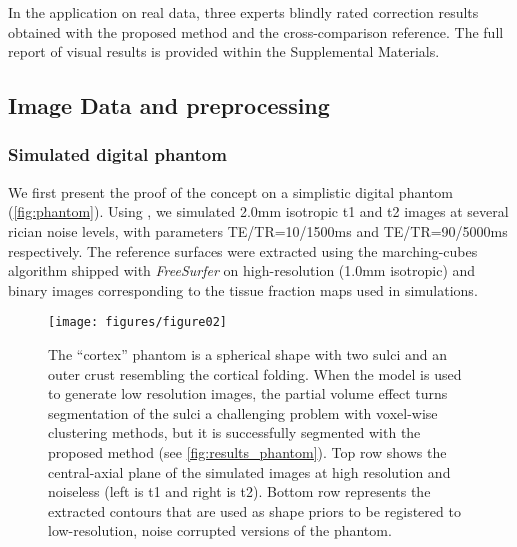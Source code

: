 In the application on real data, three experts blindly rated correction results obtained
  with the proposed method and the cross-comparison reference.
The full report of visual results is provided within the Supplemental Materials.




\subsection{Image Data and preprocessing}
\label{sec:datasets}

\subsubsection{Simulated digital phantom} %
\label{sec:digital_phantoms}
%
We first present the proof of the concept on a simplistic digital phantom
  (\autoref{fig:phantom}).
Using \cite{caruyer_phantomas_2014}, we simulated 2.0mm isotropic \gls*{t1} and
  \gls*{t2} images at several rician noise levels, with parameters TE/TR=10/1500ms
  and TE/TR=90/5000ms respectively.
The reference surfaces were extracted using the marching-cubes algorithm
  shipped with \emph{FreeSurfer} \citep{fischl_freesurfer_2012}
  on high-resolution (1.0mm isotropic) and binary images corresponding to
  the tissue fraction maps used in simulations.

\begin{figure}
	\texttt{[image: figures/figure02]}
	\caption{The ``cortex'' phantom is a spherical shape with two sulci and an
	 outer crust resembling the cortical folding.
	When the model is used to generate low resolution images, the
	  partial volume effect turns segmentation of the sulci a
	  challenging problem with voxel-wise clustering methods,
	  but it is successfully segmented with the proposed method (see
	  \autoref{fig:results_phantom}).
	Top row shows the central-axial plane of the simulated images at
	  high resolution and noiseless (left is \gls*{t1} and right is
	  \gls*{t2}).
	Bottom row represents the extracted contours that are used as shape
	  priors to be registered to low-resolution, noise corrupted versions
	  of the phantom.
	}\label{fig:phantom}
\end{figure}

